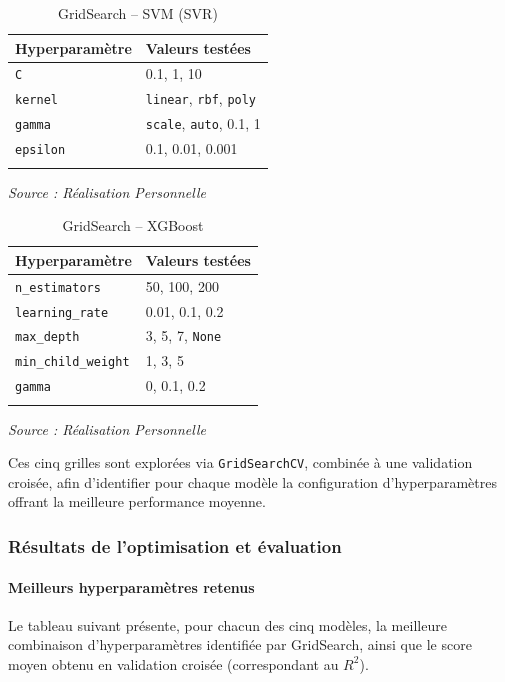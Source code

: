 \documentclass[a4paper,12pt, oneside]{article}
\begin{document}
\begin{longtable}{|p{5cm}|p{12cm}|}
\hline
\textbf{Hyperparamètre} & \textbf{Valeurs testées} \\
\hline
\texttt{C} & 0.1, 1, 10 \\
\hline
\texttt{kernel} & \texttt{linear}, \texttt{rbf}, \texttt{poly} \\
\hline
\texttt{gamma} & \texttt{scale}, \texttt{auto}, 0.1, 1 \\
\hline
\texttt{epsilon} & 0.1, 0.01, 0.001 \\
\hline
\caption{GridSearch -- SVM (SVR)} \\
\end{longtable}
\begin{center}
\vspace{-0.85cm}
\textit{Source : Réalisation Personnelle}
\end{center}

\begin{longtable}{|p{5cm}|p{12cm}|}
\hline
\textbf{Hyperparamètre} & \textbf{Valeurs testées} \\
\hline


\texttt{n\_estimators} & 50, 100, 200 \\
\hline
\texttt{learning\_rate} & 0.01, 0.1, 0.2 \\
\hline
\texttt{max\_depth} & 3, 5, 7, \texttt{None} \\
\hline
\texttt{min\_child\_weight} & 1, 3, 5 \\
\hline
\texttt{gamma} & 0, 0.1, 0.2 \\
\hline
\caption{GridSearch -- XGBoost} \\
\end{longtable}
\begin{center}
\vspace{-0.85cm}
\textit{Source : Réalisation Personnelle}
\end{center}

Ces cinq grilles sont explorées via \texttt{GridSearchCV}, combinée à une validation croisée, afin d'identifier pour chaque modèle la configuration d'hyperparamètres offrant la meilleure performance moyenne.

\subsubsection{Résultats de l'optimisation et évaluation}

\paragraph{Meilleurs hyperparamètres retenus\\}
Le tableau suivant présente, pour chacun des cinq modèles, la meilleure combinaison d'hyperparamètres identifiée par GridSearch, ainsi que le score moyen obtenu en validation croisée (correspondant au $R^2$).
\end{document}
